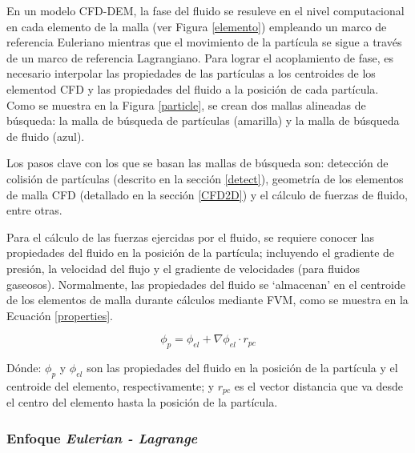 \noindent
\justify

En un modelo CFD-DEM, la fase del fluido se resuleve en el nivel computacional en cada elemento de la malla (ver Figura \ref{elemento}) empleando un marco de referencia Euleriano mientras que el movimiento de la part\'icula se sigue a trav\'es de un marco de referencia Lagrangiano. Para lograr el acoplamiento de fase, es necesario interpolar las propiedades de las part\'iculas a los centroides de los elementod CFD y las propiedades del fluido a la posici\'on de cada part\'icula. Como se muestra en la Figura \ref{particle}, se crean dos mallas alineadas de b\'usqueda: la malla de b\'usqueda de part\'iculas (amarilla) y la malla de b\'usqueda de fluido (azul). 



\noindent
\justify

Los pasos clave con los que se basan las mallas de b\'usqueda son: detecci\'on de colisi\'on de part\'iculas (descrito en la secci\'on \ref{detect}), geometr\'ia de los elementos de malla CFD (detallado en la secci\'on \ref{CFD2D}) y el c\'alculo de fuerzas de fluido, entre otras.

\noindent
\justify

Para el c\'alculo de las fuerzas ejercidas por el fluido, se requiere conocer las propiedades del fluido en la posici\'on de la part\'icula; incluyendo el gradiente de presi\'on, la velocidad del flujo y el gradiente de velocidades (para fluidos gaseosos). Normalmente, las propiedades del fluido se `almacenan' en el centroide de los elementos de malla durante c\'alculos mediante FVM, como se muestra en la Ecuaci\'on \ref{properties}.

\begin{equation}
\phi _p = \phi _{el} + \nabla \phi _{el} \cdot r_{pc}
\label{properties}
\end{equation}

\noindent
\justify

D\'onde: $\phi _p$ y $\phi _{el}$ son las propiedades del fluido en la posici\'on de la part\'icula y el centroide del elemento, respectivamente; y $r_{pc}$ es el vector distancia que va desde el centro del elemento hasta la posici\'on de la part\'icula. 

\subsubsection{Enfoque \textit{Eulerian - Lagrange}} \label{EuLag}

\noindent
\justify

